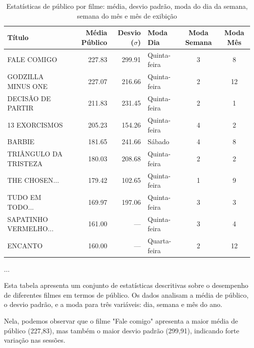 \documentclass{article}
\begin{document}
\begin{table}[H]
\centering
\caption{Estatísticas de público por filme: média, desvio padrão, moda do dia da semana, semana do mês e mês de exibição}
\begin{small}
\begin{tabularx}{\textwidth}{X r r l c c}
\hline
\textbf{Título} & \textbf{Média Público} & \textbf{Desvio ($\sigma$)} & \textbf{Moda Dia} & \textbf{Moda Semana} & \textbf{Moda Mês} \\
\hline
FALE COMIGO & 227.83 & 299.91 & Quinta-feira & 3 & 8 \\
GODZILLA MINUS ONE & 227.07 & 216.66 & Quinta-feira & 2 & 12 \\
DECISÃO DE PARTIR & 211.83 & 231.45 & Quinta-feira & 2 & 1 \\
13 EXORCISMOS & 205.23 & 154.26 & Quinta-feira & 4 & 2 \\
BARBIE & 181.65 & 241.66 & Sábado & 4 & 8 \\
TRIÂNGULO DA TRISTEZA & 180.03 & 208.68 & Quinta-feira & 2 & 2 \\
THE CHOSEN... & 179.42 & 102.65 & Quinta-feira & 1 & 9 \\
TUDO EM TODO... & 169.97 & 197.06 & Quinta-feira & 3 & 3 \\
SAPATINHO VERMELHO... & 161.00 & --- & Quinta-feira & 3 & 4 \\
ENCANTO & 160.00 & --- & Quarta-feira & 2 & 12 \\

\end{tabularx}
\end{small}
\begin{center}
$\ldots$
\end{center}
\end{table}

Esta tabela apresenta um conjunto de estatísticas descritivas sobre o desempenho de diferentes 
filmes em termos de público. Os dados analisam a média de público, o desvio padrão, e a moda para três variáveis: dia, semana e mês do ano.

Nela, podemos observar que o filme "Fale comigo" apresenta a maior média de público (227,83), mas 
também o maior desvio padrão (299,91), indicando forte variação nas sessões.
\end{document}
